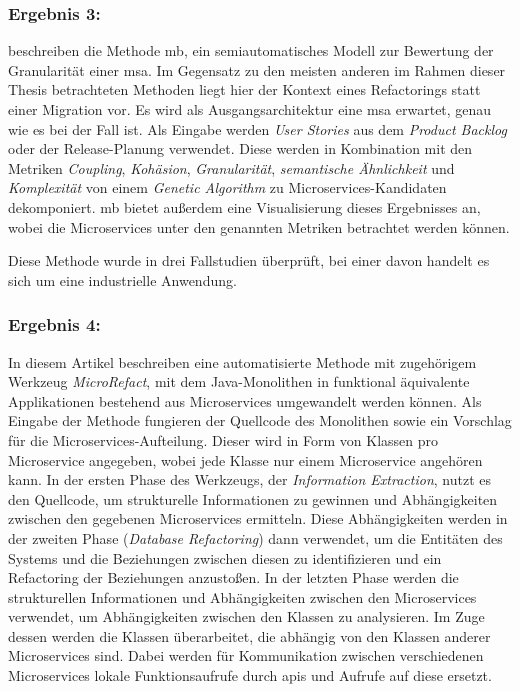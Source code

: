 
\subsubsection{Ergebnis 3:  \cite{arh-result-no-filter-2}}

\citeauthor{arh-result-no-filter-2} beschreiben die Methode \gls{mb}, ein semiautomatisches Modell zur Bewertung der Granularität einer \gls{msa}.
Im Gegensatz zu den meisten anderen  im Rahmen dieser Thesis betrachteten Methoden liegt hier der Kontext eines Refactorings statt einer Migration vor.
Es wird als Ausgangsarchitektur eine \gls{msa} erwartet, genau wie es bei \jf der Fall ist.
Als Eingabe werden \emph{User Stories} aus dem \emph{Product Backlog} oder der Release-Planung verwendet.
Diese werden in Kombination mit den Metriken \emph{Coupling}, \emph{Kohäsion}, \emph{Granularität}, \emph{semantische Ähnlichkeit} und \emph{Komplexität} von einem \emph{Genetic Algorithm} zu Microservices-Kandidaten dekomponiert.
\gls{mb} bietet außerdem eine Visualisierung dieses Ergebnisses an, wobei die Microservices unter den genannten Metriken betrachtet werden können.

Diese Methode wurde in drei Fallstudien überprüft, bei einer davon handelt es sich um eine industrielle Anwendung.


\subsubsection{Ergebnis 4:  \cite{arh-result-no-filter-4}}

In diesem Artikel beschreiben \citeauthor{arh-result-no-filter-4} eine automatisierte Methode mit zugehörigem Werkzeug \emph{MicroRefact}, mit dem Java-Monolithen in funktional äquivalente Applikationen bestehend aus Microservices umgewandelt werden können.
Als Eingabe der Methode fungieren der Quellcode des Monolithen sowie ein Vorschlag für die Microservices-Aufteilung. Dieser wird in Form von Klassen pro Microservice angegeben, wobei jede Klasse nur einem Microservice angehören kann.
In der ersten Phase des Werkzeugs, der \emph{Information Extraction}, nutzt es den Quellcode, um strukturelle Informationen zu gewinnen und Abhängigkeiten zwischen den gegebenen Microservices ermitteln.
Diese Abhängigkeiten werden in der zweiten Phase (\emph{Database Refactoring}) dann verwendet, um die Entitäten des Systems und die Beziehungen zwischen diesen zu identifizieren und ein Refactoring der Beziehungen anzustoßen.
In der letzten Phase werden die strukturellen Informationen und Abhängigkeiten zwischen den Microservices verwendet, um Abhängigkeiten zwischen den Klassen zu analysieren.
Im Zuge dessen werden die Klassen überarbeitet, die abhängig von den Klassen anderer Microservices sind.
Dabei werden für Kommunikation zwischen verschiedenen Microservices lokale Funktionsaufrufe durch \glspl{api} und Aufrufe auf diese ersetzt.

